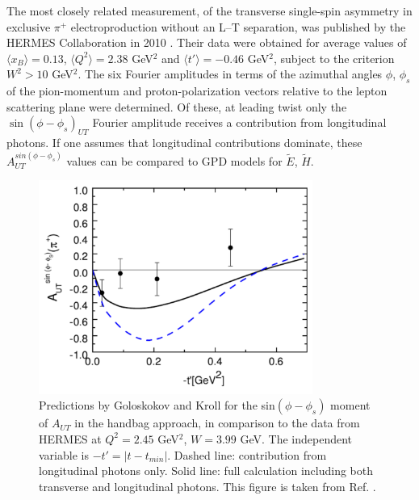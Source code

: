 The most closely related measurement, of the transverse single-spin asymmetry
in exclusive $\pi^+$ electroproduction without an L--T separation, was
published by the HERMES Collaboration in 2010 \cite{hermes10}.  Their data were
obtained for average values of $\langle x_B \rangle =0.13$, $\langle Q^2 \rangle
=2.38$ GeV$^2$ and $\langle t' \rangle = -0.46$ GeV$^2$, subject to the
criterion $W^2>10$ GeV$^2$.  The six Fourier amplitudes in terms of the
azimuthal angles $\phi$, $\phi_s$ of the pion-momentum and proton-polarization
vectors relative to the lepton scattering plane were determined.  Of these, at
leading twist only the $\sin(\phi-\phi_s)_{UT}$ Fourier amplitude receives a
contribution from longitudinal photons.  
If one assumes that longitudinal
contributions dominate, these $A_{UT}^{sin(\phi-\phi_s)}$ values can be
compared to GPD models for $\tilde{E}$, $\tilde{H}$.

\begin{figure}[hbt!]
\begin{center}
\includegraphics[height=7cm]{./figures/hermes_Aut.pdf}
\end{center}
\caption{\label{fig:hermes_aut}
\footnotesize{
Predictions by Goloskokov and Kroll for the sin$(\phi-\phi_s)$ moment of
$A_{UT}$ in the handbag approach, in comparison to the data from HERMES at
$Q^2=2.45$ GeV$^2$, $W=3.99$ GeV.  The independent variable is
$-t'=|t-t_{min}|$.  Dashed line: contribution from longitudinal photons only.
Solid line: full calculation including both transverse and longitudinal
photons.  This figure is taken from Ref. .}}
\end{figure}

